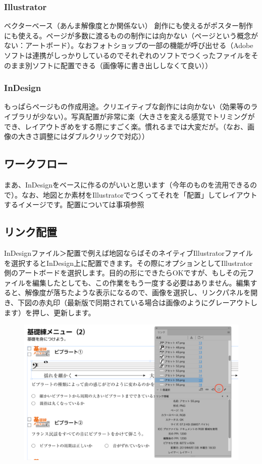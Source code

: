 \documentclass[dvipdfmx,jb5]{jarticle}
\begin{document}
\subsubsection{Illustrator}
ベクターベース（あんま解像度とか関係ない）
創作にも使えるがポスター制作にも使える。ページが多数に渡るものの制作には向かない（ページという概念がない：アートボード）。なおフォトショップの一部の機能が呼び出せる（Adobeソフトは連携がしっかりしているのでそれぞれのソフトでつくったファイルをそのまま別ソフトに配置できる（画像等に書き出ししなくて良い））
\subsubsection{InDesign}
もっぱらページもの作成用途。クリエイティブな創作には向かない（効果等のライブラリが少ない）。写真配置が非常に楽（大きさを変える感覚でトリミングができ、レイアウトぎめをする際にすごく楽。慣れるまでは大変だが。（なお、画像の大きさ調整にはダブルクリックで対応））

\subsection{ワークフロー}
まあ、InDesignをベースに作るのがいいと思います（今年のものを流用できるので）。なお、地図とか素材をIllustratorでつくってそれを「配置」してレイアウトするイメージです。配置については事項参照

\subsection{リンク配置}
InDesignファイル＞配置で例えば地図ならばそのネイティブIllustratorファイルを選択するとInDesign上に配置できます。その際にオプションとしてIllustrator側のアートボードを選択します。目的の形にできたらOKですが、もしその元ファイルを編集したとしても、この作業をもう一度する必要はありません。編集すると、解像度が落ちたような表示になるので、画像を選択し、リンクパネルを開き、下図の赤丸印（最新版で同期されている場合は画像のようにグレーアウトします）を押し、更新します。

\begin{figure}[H]
  \includegraphics[scale=0.7]{assets/pmh0.png}
\end{figure}
\end{document}
